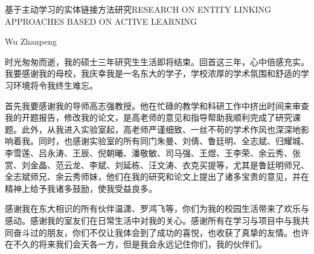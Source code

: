 \documentclass[nomlist,masters,openany]{seuthesix}
\begin{document}
\title{\quad}{基于主动学习的实体链接方法研究}{\quad}{RESEARCH ON ENTITY LINKING APPROACHES BASED ON ACTIVE LEARNING}
\author{张赏}{Wu Zhanpeng}
\makebigcover
\makecover


\tableofcontents
\listofothers

\mainmatter











\acknowledgement
时光匆匆而逝，我的硕士三年研究生生活即将结束。回首这三年，心中倍感充实。我要感谢我的母校，我庆幸我是一名东大的学子，学校浓厚的学术氛围和舒适的学习环境将令我终生难忘。

首先我要感谢我的导师高志强教授。他在忙碌的教学和科研工作中挤出时间来审查我的开题报告，修改我的论文，是高老师的意见和指导帮助我顺利完成了研究课题。此外，从我进入实验室起，高老师严谨细致、一丝不苟的学术作风也深深地影响着我。同时，也感谢实验室的所有同门朱曼、刘倩、鲁廷明、全志斌、归耀城、李雪莲、吕永涛、王辰、倪朝曦、潘敬敏、司马强、王煜、王李荣、余云秀、张赏、刘金晶、范云龙、李斌、刘延栋、汪文涛、衣克买提等，尤其是鲁廷明师兄、全志斌师兄、余云秀师妹，他们在我的研究和论文上提出了诸多宝贵的意见，并在精神上给予我诸多鼓励，使我受益良多。

感谢我在东大相识的所有伙伴温潇、罗鸿飞等，你们为我的校园生活带来了欢乐与感动。感谢我的室友们在日常生活中对我的关心。感谢所有在学习与项目中与我共同奋斗过的朋友，你们不仅让我体会到了成功的喜悦，也收获了真挚的友情。也许在不久的将来我们会天各一方，但是我会永远记住你们，我的伙伴们。
\end{document}

